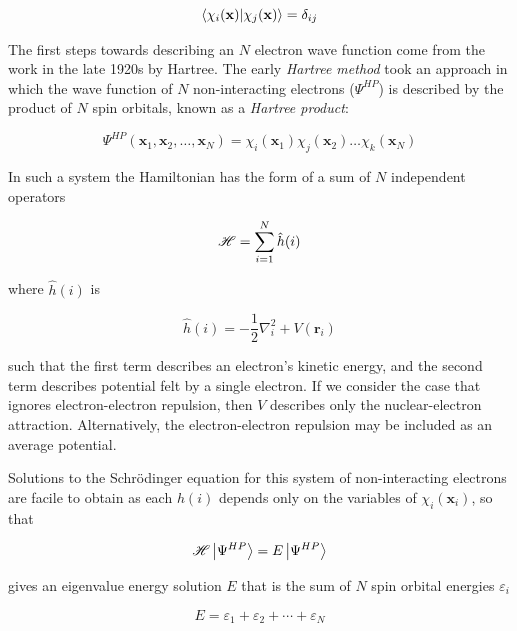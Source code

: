 \begin{doublespace}
\begin{equation}
\bra{\chi_i(\mathbf{x})}\ket{\chi_j(\mathbf{x})} = \delta_{ij}
\end{equation}

The first steps towards describing an $N$ electron wave function come from the
work in the late 1920s by Hartree. The early \emph{Hartree method} took an
approach in which the wave function of $N$ non-interacting electrons
($\Psi^{HP}$) is described by the product of $N$ spin orbitals, known as a
\emph{Hartree product}:

\begin{equation}
\Psi^{HP}(\mathbf{x}_1,\mathbf{x}_2,\ldots,\mathbf{x}_N) = \chi_i(\mathbf{x}_1)\chi_j(\mathbf{x}_2)\dots\chi_k(\mathbf{x}_N)
\end{equation}

\noindent In such a system the Hamiltonian has the form of a sum of $N$
independent operators

\begin{equation}
  \mathscr{H} = \sum_{i=1}^N \hat{h}(i)
\end{equation}

\noindent where $\hat{h}(i)$ is

\begin{equation}
  \hat{h}(i) = -\frac{1}{2} \nabla_i^2 + V(\mathbf{r}_i)
\end{equation}

\noindent such that the first term describes an electron's kinetic energy, and
the second term describes potential felt by a single electron. If we consider
the case that ignores electron-electron repulsion, then $V$ describes only
the nuclear-electron attraction. Alternatively, the electron-electron repulsion
may be included as an average potential.

Solutions to the Schr{\"o}dinger equation for this system of non-interacting
electrons are facile to obtain as each $h(i)$ depends only on the variables of
$\chi_i(\mathbf{x}_i)$, so that

\begin{equation}
  \mathscr{H} \ket{\Psi^{HP}} = E \ket{\Psi^{HP}}
\end{equation}

\noindent gives an eigenvalue energy solution $E$ that is the sum of $N$ spin
orbital energies $\varepsilon_i$

\begin{equation}
E = \varepsilon_1 + \varepsilon_2 + \cdots + \varepsilon_N
\end{equation}


\end{doublespace}
